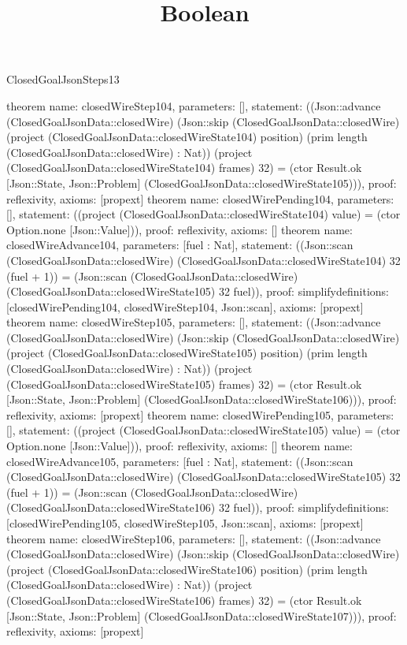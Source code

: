 \begin{lexlean}{ClosedGoalJsonSteps13}
\title{Boolean}
\begin{semanticmodule}
theorem{
 name: closedWireStep104, parameters: [],
 statement: ((Json::advance (ClosedGoalJsonData::closedWire) (Json::skip (ClosedGoalJsonData::closedWire) (project (ClosedGoalJsonData::closedWireState104) position) (prim length (ClosedGoalJsonData::closedWire) : Nat)) (project (ClosedGoalJsonData::closedWireState104) frames) 32) = (ctor Result.ok [Json::State, Json::Problem] (ClosedGoalJsonData::closedWireState105))), proof: reflexivity{}, axioms: [propext]
}
theorem{
 name: closedWirePending104, parameters: [],
 statement: ((project (ClosedGoalJsonData::closedWireState104) value) = (ctor Option.none [Json::Value])), proof: reflexivity{}, axioms: []
}
theorem{
 name: closedWireAdvance104, parameters: [fuel : Nat],
 statement: ((Json::scan (ClosedGoalJsonData::closedWire) (ClosedGoalJsonData::closedWireState104) 32 (fuel + 1)) = (Json::scan (ClosedGoalJsonData::closedWire) (ClosedGoalJsonData::closedWireState105) 32 fuel)), proof: simplify{definitions: [closedWirePending104, closedWireStep104, Json::scan]}, axioms: [propext]
}
theorem{
 name: closedWireStep105, parameters: [],
 statement: ((Json::advance (ClosedGoalJsonData::closedWire) (Json::skip (ClosedGoalJsonData::closedWire) (project (ClosedGoalJsonData::closedWireState105) position) (prim length (ClosedGoalJsonData::closedWire) : Nat)) (project (ClosedGoalJsonData::closedWireState105) frames) 32) = (ctor Result.ok [Json::State, Json::Problem] (ClosedGoalJsonData::closedWireState106))), proof: reflexivity{}, axioms: [propext]
}
theorem{
 name: closedWirePending105, parameters: [],
 statement: ((project (ClosedGoalJsonData::closedWireState105) value) = (ctor Option.none [Json::Value])), proof: reflexivity{}, axioms: []
}
theorem{
 name: closedWireAdvance105, parameters: [fuel : Nat],
 statement: ((Json::scan (ClosedGoalJsonData::closedWire) (ClosedGoalJsonData::closedWireState105) 32 (fuel + 1)) = (Json::scan (ClosedGoalJsonData::closedWire) (ClosedGoalJsonData::closedWireState106) 32 fuel)), proof: simplify{definitions: [closedWirePending105, closedWireStep105, Json::scan]}, axioms: [propext]
}
theorem{
 name: closedWireStep106, parameters: [],
 statement: ((Json::advance (ClosedGoalJsonData::closedWire) (Json::skip (ClosedGoalJsonData::closedWire) (project (ClosedGoalJsonData::closedWireState106) position) (prim length (ClosedGoalJsonData::closedWire) : Nat)) (project (ClosedGoalJsonData::closedWireState106) frames) 32) = (ctor Result.ok [Json::State, Json::Problem] (ClosedGoalJsonData::closedWireState107))), proof: reflexivity{}, axioms: [propext]
}
\end{semanticmodule}
\end{lexlean}
